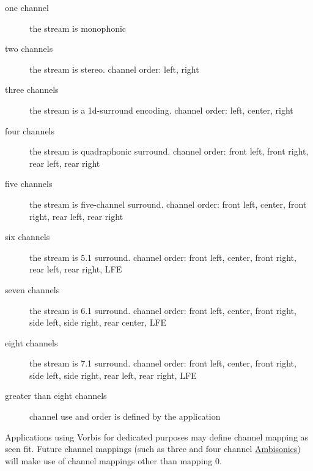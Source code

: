 \begin{description} %
 \item[one channel]
	the stream is monophonic

\item[two channels]
	the stream is stereo.  channel order: left, right

\item[three channels]
	the stream is a 1d-surround encoding.  channel order: left,
center, right

\item[four channels]
	the stream is quadraphonic surround.  channel order: front left,
front right, rear left, rear right

\item[five channels]
	the stream is five-channel surround.  channel order: front left,
center, front right, rear left, rear right

\item[six channels]
	the stream is 5.1 surround.  channel order: front left, center, 
front right, rear left, rear right, LFE

\item[seven channels]
        the stream is 6.1 surround.  channel order: front left, center, 
front right, side left, side right, rear center, LFE

\item[eight channels]
        the stream is 7.1 surround.  channel order: front left, center, 
front right, side left, side right, rear left, rear right, 
LFE

\item[greater than eight channels]
	channel use and order is defined by the application

\end{description}

Applications using Vorbis for dedicated purposes may define channel
mapping as seen fit.  Future channel mappings (such as three and four
channel \href{http://www.ambisonic.net/}{Ambisonics}) will
make use of channel mappings other than mapping 0.


